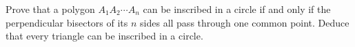 Prove that a polygon $A_1A_2\cdots A_n$ can be inscribed in a circle if and only if the perpendicular bisectors of its $n$ sides all pass through one common point. Deduce that every triangle can be inscribed in a circle.

